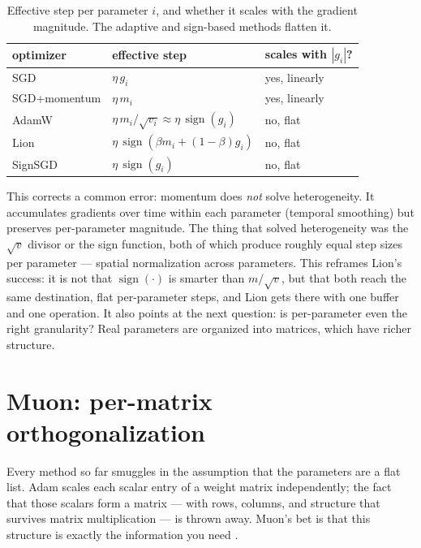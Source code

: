 \documentclass[10pt,conference]{IEEEtran}
\newcommand{\sign}{\operatorname{sign}}
\begin{document}
\begin{table}[t]
\centering
\caption{Effective step per parameter $i$, and whether it scales with the
gradient magnitude. The adaptive and sign-based methods flatten it.}
\label{tab:norm}
\small
\begin{tabular}{@{}lll@{}}
\toprule
optimizer & effective step & scales with $|g_i|$? \\
\midrule
SGD            & $\eta\, g_i$ & yes, linearly \\
SGD+momentum   & $\eta\, m_i$ & yes, linearly \\
AdamW          & $\eta\, m_i/\sqrt{v_i}\approx\eta\,\sign(g_i)$ & no, flat \\
Lion           & $\eta\,\sign(\beta m_i + (1{-}\beta) g_i)$ & no, flat \\
SignSGD        & $\eta\,\sign(g_i)$ & no, flat \\
\bottomrule
\end{tabular}
\end{table}

This corrects a common error: momentum does \emph{not} solve heterogeneity. It
accumulates gradients over time within each parameter (temporal smoothing) but
preserves per-parameter magnitude. The thing that solved heterogeneity was the
$\sqrt{v}$ divisor or the sign function, both of which produce roughly equal step
sizes per parameter --- spatial normalization across parameters. This reframes
Lion's success: it is not that $\sign(\cdot)$ is smarter than $m/\sqrt{v}$, but
that both reach the same destination, flat per-parameter steps, and Lion gets
there with one buffer and one operation. It also points at the next question: is
per-parameter even the right granularity? Real parameters are organized into
matrices, which have richer structure.

\section{Muon: per-matrix orthogonalization}
Every method so far smuggles in the assumption that the parameters are a flat
list. Adam scales each scalar entry of a weight matrix independently; the fact
that those scalars form a matrix --- with rows, columns, and structure that
survives matrix multiplication --- is thrown away. Muon's bet is that this
structure is exactly the information you need \cite{ref10,ref11}.
\end{document}
